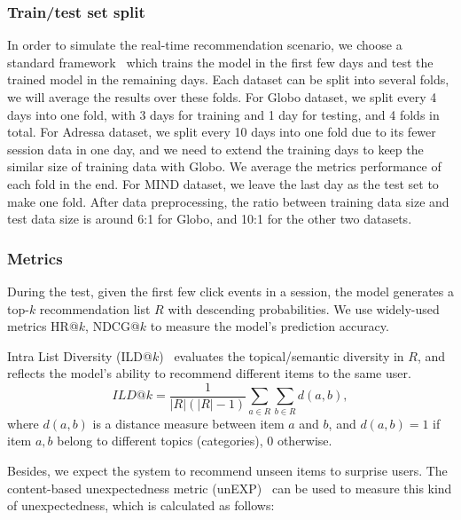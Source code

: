 \subsubsection{Train/test set split}
In order to simulate the real-time recommendation 
scenario, we choose a standard framework~\cite{jugovac_streamingrec:_2018} 
which trains the model in the first few days and test the trained model in the remaining
days. Each dataset can be split into several folds, 
we will average the results over these folds.
For Globo dataset, we split every 4 days into one fold, with 3 days for training and 1 day for testing, and 4 folds in total. 
For Adressa dataset, we split every 10 days into one fold due to its fewer session data in one day, and we need to extend the training days to keep the similar size of training data with Globo. 
We average the metrics performance of each fold in the end. For MIND dataset, we leave the last day as the test set to make one fold. 
After data preprocessing, the ratio between training data size and test data size 
is around 6:1 for Globo, and 10:1 for the other two datasets. 


\subsubsection{Metrics}
During the test, given the first few click events in a session, the model generates 
a top-$k$ recommendation list $R$ with descending probabilities. 
We use widely-used metrics HR@$k$, NDCG@$k$ to 
measure the model's prediction accuracy.

Intra List Diversity (ILD@$k$)~\cite{symeonidis2020session} evaluates the topical/semantic 
diversity in $R$, and reflects the model's ability to recommend different items to the same user. 
\begin{equation}
  ILD@k = \frac{1}{|R|(|R|-1)}\sum_{a\in R}\sum_{b\in R}d(a,b),
\end{equation}
where $d(a, b)$ is a distance measure between item $a$ and $b$, and 
$d(a, b) = 1$ if item $a, b$ belong to different topics (categories), 0 otherwise.

Besides, we expect the system to recommend unseen items to surprise users. The content-based unexpectedness metric (unEXP)~\cite{kaminskas2014measuring} can be used to measure this kind of unexpectedness, which is calculated as follows:

